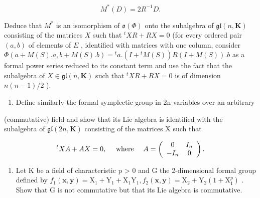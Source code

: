 \[
M ^ {*} (D) = 2 R ^ {- 1} D.
\]

  Deduce that \(M^*\) is an isomorphism of \(\mathfrak{o}(\Phi)\) onto the subalgebra of \(\mathfrak{gl}(n, \mathbf{K})\) consisting of the matrices \(X\) such that \({}^{t}XR + RX = 0\) (for every ordered pair \((a, b)\) of elements of \(E\) , identified with matrices with one column, consider \(\Phi(a + M(S).a, b + M(S).b) = {}^{t}a.(I + {}^{t}M(S))R(I + M(S)).b\) as a formal power series reduced to its constant term and use the fact that the subalgebra of \(X \in \mathfrak{gl}(n, \mathbf{K})\) such that \({}^{t}XR + RX = 0\) is of dimension \(n(n - 1)/2\) ).

\begin{enumerate}
\def\labelenumi{(\alph{enumi})}
\setcounter{enumi}{2}
\tightlist
\item
  Define similarly the formal symplectic group in 2n variables over an arbitrary
\end{enumerate}

 (commutative) field and show that its Lie algebra is identified with the subalgebra of \(\mathfrak{gl}(2n,\mathbf{K})\) consisting of the matrices X such that

\[
{ } ^ { t } X A + A X = 0 , \quad \text {   where   } \quad A = \left( \begin{array} { c c } 0 & I _ { n } \\ - I _ { n } & 0 \end{array} \right) .
\]

\begin{enumerate}
\def\labelenumi{\arabic{enumi}.}
\setcounter{enumi}{26}
\tightlist
\item
  Let K be a field of characteristic p \textgreater{} 0 and G the 2-dimensional formal group defined by \(f_{1}(\mathbf{x}, \mathbf{y}) = \mathrm{X}_{1} + \mathrm{Y}_{1} + \mathrm{X}_{1}\mathrm{Y}_{1}, f_{2}(\mathbf{x}, \mathbf{y}) = \mathrm{X}_{2} + \mathrm{Y}_{2}(1 + \mathrm{X}_{1}^{p})\) . Show that G is not commutative but that its Lie algebra is commutative.
\end{enumerate}

